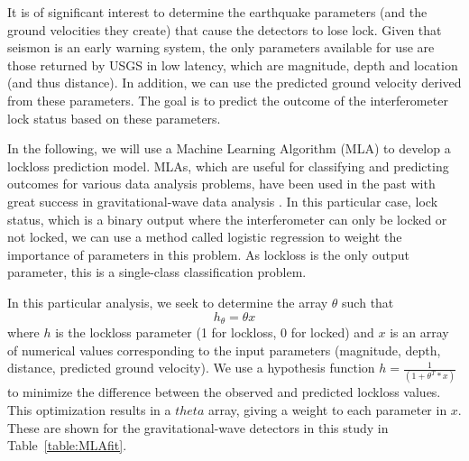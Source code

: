 \documentclass[reprint, prl, aps, showpacs]{revtex4-1}
\newcommand{\seismon}{\textnormal{seismon }}
\begin{document}

It is of significant interest to determine the earthquake parameters (and the ground velocities they create) that cause the detectors to lose lock.
Given that \seismon is an early warning system, the only parameters available for use are those returned by USGS in low latency, which are magnitude, depth and location (and thus distance). 
In addition, we can use the predicted ground velocity derived from these parameters.
The goal is to predict the outcome of the interferometer lock status based on these parameters.

In the following, we will use a Machine Learning Algorithm (MLA) to develop a lockloss prediction model. MLAs, which are useful for classifying and predicting outcomes for various data analysis problems, have been used in the past with great success in gravitational-wave data analysis \cite{BiBl2013,KyHa2015}. In this particular case, lock status, which is a binary output where the interferometer can only be locked or not locked, we can use a method called logistic regression to weight the importance of parameters in this problem. As lockloss is the only output parameter, this is a single-class classification problem.

In this particular analysis, we seek to determine the array $\theta$ such that \begin{equation}
h_{\theta} = \theta x
\label{eq:MLA}
\end{equation}
where $h$ is the lockloss parameter (1 for lockloss, 0 for locked) and $x$ is an array of numerical values corresponding to the input parameters (magnitude, depth, distance, predicted ground velocity). We use a hypothesis function $h= \frac{1}{(1+{\theta^{T}*x})}$ to minimize the difference between the observed and predicted lockloss values. This optimization results in a $theta$ array, giving a weight to each parameter in $x$.
These are shown for the gravitational-wave detectors in this study in Table~\ref{table:MLAfit}. 
\end{document}
